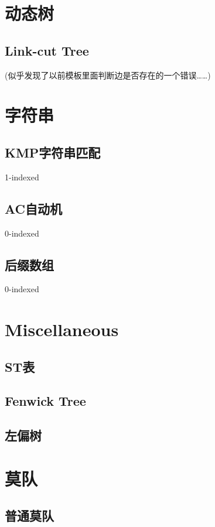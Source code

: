 \documentclass{article}
\begin{document}
	\newpage

	\section{动态树}
		\subsection{Link-cut Tree}
		(似乎发现了以前模板里面判断边是否存在的一个错误……)
		
	\newpage

	\section{字符串}
		\subsection{KMP字符串匹配}
		1-indexed
		\subsection{AC自动机}
		0-indexed
		
		\subsection{后缀数组}
		0-indexed
		

	\newpage

	\section{Miscellaneous}
		\subsection{ST表}
		
		\subsection{Fenwick Tree}
		
		\subsection{左偏树}
		
	\newpage

	\section{莫队}
		\subsection{普通莫队}
\end{document}
